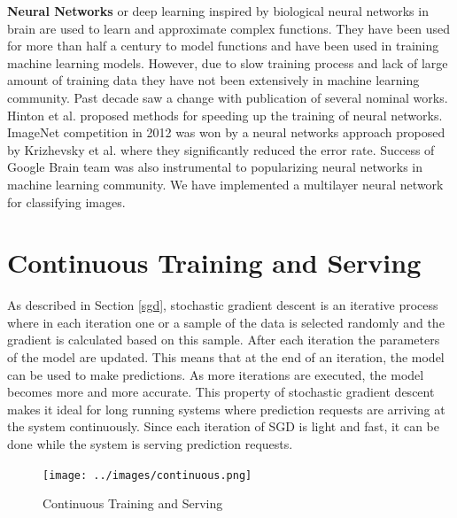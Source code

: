 \documentclass{sig-alternate-05-2015}
\begin{document}
\textbf{Neural Networks} or deep learning inspired by biological neural networks in brain are used to learn and approximate complex functions. 
They have been used for more than half a century to model functions and have been used in training machine learning models.
However, due to slow training process and lack of large amount of training data they have not been extensively in machine learning community.
Past decade saw a change with publication of several nominal works.
Hinton et al. \cite{hinton2006fast} proposed methods for speeding up the training of neural networks.
ImageNet competition \cite{ILSVRC15} in 2012 was won by a neural networks approach proposed by Krizhevsky et al. \cite{krizhevsky2012imagenet} where they significantly reduced the error rate. 
Success of Google Brain team \cite{sutskever2014sequence, mikolov2013efficient} was also instrumental to popularizing neural networks in machine learning community.
We have implemented a multilayer neural network for classifying images.

\section{Continuous Training and Serving} \label{continious-training-serving}
As described in Section \ref{sgd}, stochastic gradient descent is an iterative process where in each iteration one or a sample of the data is selected randomly and the gradient is calculated based on this sample. 
After each iteration the parameters of the model are updated.
This means that at the end of an iteration, the model can be used to make predictions.
As more iterations are executed, the model becomes more and more accurate.
This property of stochastic gradient descent makes it ideal for long running systems where prediction requests are arriving at the system continuously.
Since each iteration of SGD is light and fast, it can be done while the system is serving prediction requests.
\begin{figure}[h]
\centering
\texttt{[image: ../images/continuous.png]}
\caption{Continuous Training and Serving}
\label{fig:cont-training-serving}
\end{figure}
\end{document}
